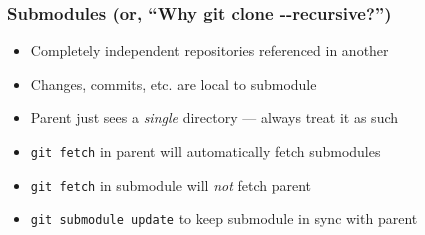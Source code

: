 \begin{frame}
 \frametitle{Submodules (or, ``Why git clone -{}-recursive?'')}

 \begin{itemize}
  \item Completely \alert{independent} repositories referenced in another
  \item Changes, commits, etc.{} are local to submodule
  \item Parent just sees a \textit{single} directory --- always treat it as such
  \item \texttt{git fetch} in parent will automatically fetch submodules
  \item \texttt{git fetch} in submodule will \textit{not} fetch parent
  \item \texttt{git submodule update} to keep submodule in sync with parent
 \end{itemize}
\end{frame}
